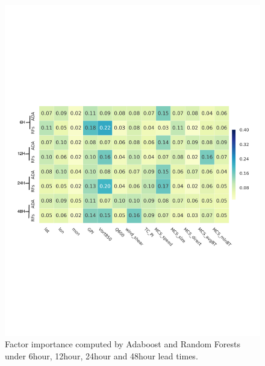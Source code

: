 \documentclass{article}
\begin{document}
\begin{figure}[h] %
\includegraphics[width=30pc]{figs/imp_global.pdf}
\caption{Factor importance computed by Adaboost and Random Forests under 6\-hour, 12\-hour, 24\-hour and 48\-hour lead times.}
\label{figone}
\end{figure}
\end{document}
